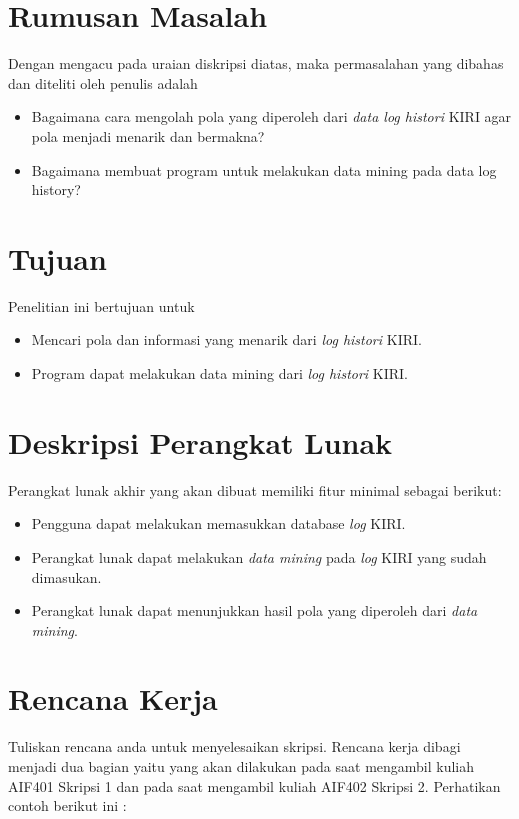 \documentclass[a4paper,twoside]{article}
\begin{document}
\section{Rumusan Masalah}
Dengan mengacu pada uraian diskripsi diatas, maka permasalahan yang dibahas dan diteliti oleh penulis adalah
\begin{itemize}
	\item Bagaimana cara mengolah pola yang diperoleh dari \textsl{data log histori}  KIRI agar pola menjadi menarik dan bermakna?
	\item Bagaimana membuat program untuk melakukan data mining pada data log history?
\end{itemize}

\section{Tujuan}
Penelitian ini bertujuan untuk 
\begin{itemize}
	\item Mencari pola dan informasi yang menarik dari \textsl{log histori} KIRI.
	\item Program dapat melakukan data mining dari \textsl{log histori} KIRI.
\end{itemize}

\section{Deskripsi Perangkat Lunak}
Perangkat lunak akhir yang akan dibuat memiliki fitur minimal sebagai berikut:
\begin{itemize}
	\item Pengguna dapat melakukan memasukkan database \textsl{log} KIRI.
	\item Perangkat lunak dapat melakukan \textsl{data mining} pada \textsl{log} KIRI yang sudah dimasukan.
	\item Perangkat lunak dapat menunjukkan hasil pola yang diperoleh dari \textsl{data mining}.
\end{itemize}

\section{Rencana Kerja}
Tuliskan rencana anda untuk menyelesaikan skripsi. Rencana kerja dibagi menjadi dua bagian yaitu yang akan dilakukan pada saat mengambil kuliah AIF401 Skripsi 1 dan pada saat mengambil kuliah AIF402 Skripsi 2. Perhatikan contoh berikut ini :
\end{document}
